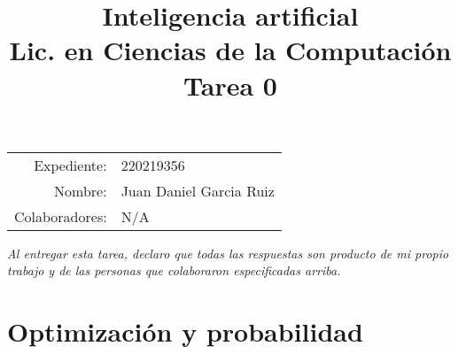 \documentclass[11pt,letterpaper]{article}
\title{%
  \bfseries
  Inteligencia artificial\\%
  Lic. en Ciencias de la Computación\\%
  Tarea 0
}
\date{}
\begin{document}
\maketitle

\vspace{-2.5cm}
\begin{center}
  \begin{tabular}{rl}
    Expediente: & 220219356\\
    Nombre: & Juan Daniel Garcia Ruiz\\
    Colaboradores: & N/A\end{tabular}
\end{center}

{\itshape Al entregar esta tarea, declaro que todas las respuestas son
  producto de mi propio trabajo y de las personas que colaboraron
  especificadas arriba.}



\section*{Optimización y probabilidad}
\end{document}
